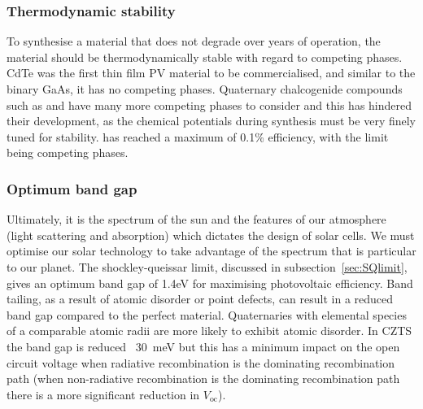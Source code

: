 \subsubsection{Thermodynamic stability}
To synthesise a material that does not degrade over years of operation, the material should be thermodynamically stable with regard to competing phases. CdTe was the first thin film PV material to be commercialised, and similar to the binary GaAs, it has no competing phases. Quaternary chalcogenide compounds such as  and  have many more competing phases to consider and this has hindered their development, as the chemical potentials during synthesis must be very finely tuned for stability.  has reached a maximum of 0.1\% efficiency, with the limit being competing phases.


\subsubsection{Optimum band gap}
Ultimately, it is the spectrum of the sun and the features of our atmosphere (light scattering and absorption) which dictates the design of solar cells. We must optimise our solar technology to take advantage of the spectrum that is particular to our planet. The shockley-queissar limit, discussed in subsection\ \ref{sec:SQlimit}, gives an optimum band gap of 1.4eV for maximising photovoltaic efficiency.\autocite{Ruhle2016}
Band tailing, as a result of atomic disorder or point defects, can result in a reduced band gap compared to the perfect material. Quaternaries with elemental species of a comparable atomic radii are more likely to exhibit atomic disorder. In CZTS the band gap is reduced ~\SI{30}{meV} but this has a minimum impact on the open circuit voltage when radiative recombination is the dominating recombination path (when non-radiative recombination is the dominating recombination path there is a more significant reduction in $V_\textrm{oc}$).\autocite{Rey2018}


